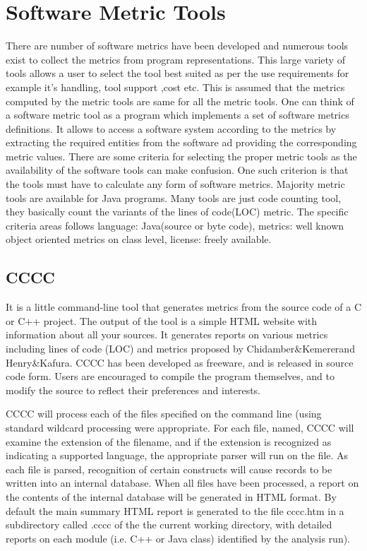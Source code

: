 \section{Software Metric Tools}
There are number of software metrics have been developed and numerous tools exist to collect the metrics from program representations. This large variety of tools allows a user to select the tool best suited as per the use requirements for example it's handling, tool support ,cost etc. This is assumed that the metrics computed by the metric tools are same for all the metric tools. One can think of a software metric tool as a program which implements a set of software metrics definitions. It allows to access a software system according to the metrics by extracting the required entities from the software ad providing the corresponding metric values. There are
some criteria for selecting the proper metric tools as the availability of the software tools can make confusion. One such criterion is that the tools must have to calculate any form of software metrics. Majority metric tools are available for Java programs. Many tools are just code counting
tool, they basically count the variants of the lines of code(LOC) metric. The specific criteria areas follows language: Java(source or byte code), metrics: well known object oriented metrics on class level, license: freely available.

\subsection{CCCC}

It is a little command-line tool that generates metrics from the source code of a C or C++ project. The output of the tool is a simple HTML website with information about all your sources. It generates reports on various metrics including lines of code (LOC) and metrics proposed by Chidamber\&Kemererand Henry\&Kafura. CCCC has been developed as freeware, and is released in source code form. Users are encouraged to compile the program themselves, and to modify the source to reflect their preferences and interests.

CCCC will process each of the files specified on the command line (using standard wildcard processing were appropriate. For each file, named, CCCC will examine the extension of the filename, and if the extension is recognized as indicating a supported language, the appropriate parser will run on the file. As each file is parsed, recognition of certain constructs will cause records to be written into an internal database. When all files have been processed, a report on the contents of the internal database
will be generated in HTML format. By default the main summary HTML report is generated to the file cccc.htm in a subdirectory called .cccc of the the current working directory, with detailed reports on each module (i.e. C++ or Java class) identified by the analysis run).

